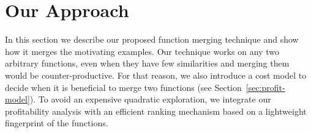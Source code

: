 \section{Our Approach} \label{sec:fm}

In this section we describe our proposed function merging technique and show
how it merges the motivating examples. Our technique works on any two
arbitrary functions, even when they have few similarities and merging them would
be counter-productive. For that reason, we also introduce a cost model to decide
when it is beneficial to merge two functions (see Section~\ref{sec:profit-model}).
To avoid an expensive quadratic exploration, we integrate our profitability analysis
with an efficient ranking mechanism based on a lightweight fingerprint of the functions.




